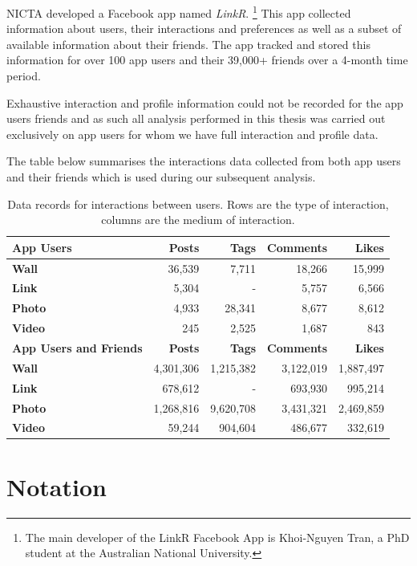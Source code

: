 NICTA developed a Facebook app named \emph{LinkR}. \footnote{The main developer of the LinkR Facebook App is Khoi-Nguyen Tran, a PhD student at the Australian National University.} 
This app collected information about users, their interactions and preferences as well as a subset of available information about 
their friends. The app tracked and stored this information for over 100 app users and their 39,000+ friends over a 4-month time period.

Exhaustive interaction and profile information could not be recorded for the app users friends and as such all analysis performed in this
thesis was carried out exclusively on app users for whom we have full interaction and profile data.

The table below summarises the interactions data collected from both app users and their friends which is used during our subsequent analysis.

\begin{table}[tbh!]
\centering
	\begin{tabular}{|l|r|r|r|r|} %
		\hline
		\textbf{App Users} & \textbf{Posts} & \textbf{Tags} & \textbf{Comments} & \textbf{Likes}  \\ \hline
		\textbf{Wall} & 36,539 & 7,711 & 18,266 & 15,999 \\ \hline
		\textbf{Link} & 5,304 & - & 5,757 & 6,566 \\ \hline
		\textbf{Photo} & 4,933 & 28,341 & 8,677 & 8,612 \\ \hline
		\textbf{Video} & 245 & 2,525 & 1,687 & 843 \\ \hline
		 \hline
		\textbf{App Users and Friends} & \textbf{Posts} & \textbf{Tags} & \textbf{Comments} & \textbf{Likes}  \\ \hline
		\textbf{Wall} & 4,301,306 & 1,215,382 & 3,122,019 & 1,887,497 \\ \hline
		\textbf{Link} & 678,612 & - & 693,930 & 995,214 \\ \hline
		\textbf{Photo} & 1,268,816 & 9,620,708 & 3,431,321 & 2,469,859 \\ \hline
		\textbf{Video} & 59,244 & 904,604 & 486,677 & 332,619 \\ \hline
	\end{tabular}
	\caption{Data records for interactions between users. Rows are the type of interaction, columns are the medium of interaction.}
	\label{tab:revpol}
\end{table}

\section{Notation}
\label{sec:notation}

